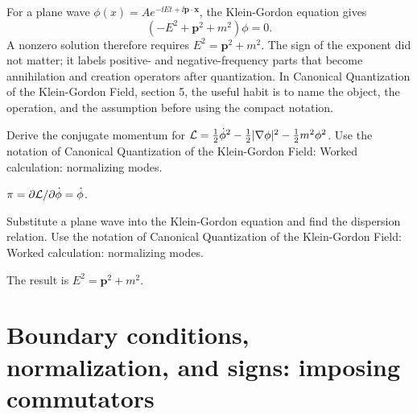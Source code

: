 \begin{example}
For a plane wave \(\phi(x)=Ae^{-\ii Et+\ii\bm p\cdot\bm x}\), the Klein-Gordon equation gives
\[
  (-E^2+\bm p^2+m^2)\phi=0.
\]
A nonzero solution therefore requires \(E^2=\bm p^2+m^2\).  The sign of the exponent did not matter; it labels positive- and negative-frequency parts that become annihilation and creation operators after quantization.  In Canonical Quantization of the Klein-Gordon Field, section 5, the useful habit is to name the object, the operation, and the assumption before using the compact notation.
\end{example}



\begin{exercise}
Derive the conjugate momentum for \(\mathcal L=\frac12\dot\phi^2-\frac12|\nabla\phi|^2-\frac12m^2\phi^2\).  Use the notation of Canonical Quantization of the Klein-Gordon Field: Worked calculation: normalizing modes.
\begin{answer}
\(\pi=\partial\mathcal L/\partial\dot\phi=\dot\phi\).
\end{answer}
\end{exercise}

\begin{exercise}
Substitute a plane wave into the Klein-Gordon equation and find the dispersion relation.  Use the notation of Canonical Quantization of the Klein-Gordon Field: Worked calculation: normalizing modes.
\begin{answer}
The result is \(E^2=\bm p^2+m^2\).
\end{answer}
\end{exercise}



\section{Boundary conditions, normalization, and signs: imposing commutators}













